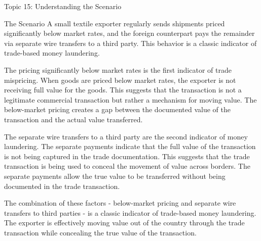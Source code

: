 \documentclass[5pt]{beamer}
\begin{document}
	\begin{frame}{Topic 15: Understanding the Scenario}
		\begin{block}{\tiny The Scenario}
			\tiny A small textile exporter regularly sends shipments priced significantly below market rates, and the foreign counterpart pays the remainder via separate wire transfers to a third party. This behavior is a classic indicator of trade-based money laundering.
			
			The pricing significantly below market rates is the first indicator of trade mispricing. When goods are priced below market rates, the exporter is not receiving full value for the goods. This suggests that the transaction is not a legitimate commercial transaction but rather a mechanism for moving value. The below-market pricing creates a gap between the documented value of the transaction and the actual value transferred.
			
			The separate wire transfers to a third party are the second indicator of money laundering. The separate payments indicate that the full value of the transaction is not being captured in the trade documentation. This suggests that the trade transaction is being used to conceal the movement of value across borders. The separate payments allow the true value to be transferred without being documented in the trade transaction.
			
			The combination of these factors - below-market pricing and separate wire transfers to third parties - is a classic indicator of trade-based money laundering. The exporter is effectively moving value out of the country through the trade transaction while concealing the true value of the transaction.
		\end{block}
	\end{frame}
	
\end{document}
